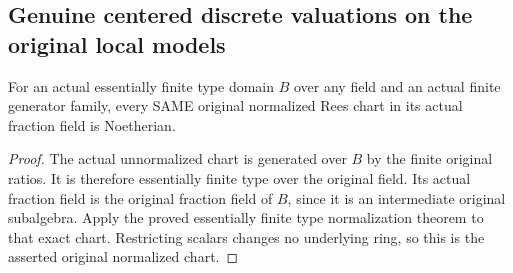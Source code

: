 \subsection{Genuine centered discrete valuations on the original local models}

\begin{lemma}
\label{algebra:actual-essentially-finite-type-rees-chart-noetherian}
\leanok
{}
For an actual essentially finite type domain $B$ over any field and an actual
finite generator family, every SAME original normalized Rees chart in its
actual fraction field is Noetherian.
\end{lemma}
\begin{proof}
The actual unnormalized chart is generated over $B$ by the finite original
ratios. It is therefore essentially finite type over the original field.
Its actual fraction field is the original fraction field of $B$, since it is
an intermediate original subalgebra. Apply the proved essentially finite type
normalization theorem to that exact chart. Restricting scalars changes no
underlying ring, so this is the asserted original normalized chart.
\end{proof}

